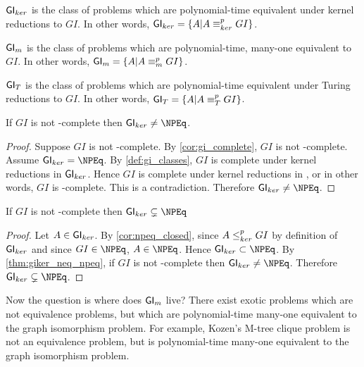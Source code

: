 \begin{definition}\label{def:gi_classes}${\mathsf{GI}}_{ker}$ is the class of problems
  which are polynomial-time equivalent under kernel reductions to $GI$. In
  other words, ${\mathsf{GI}}_{ker}=\{A|A\equiv^{p}_{ker} GI\}$.

  ${\mathsf{GI}}_m$ is the class of problems which are polynomial-time, many-one
  equivalent to $GI$. In other words, ${\mathsf{GI}}_m=\{A|A\equiv^{p}_m GI\}$.

  ${\mathsf{GI}}_T$ is the class of problems which are polynomial-time equivalent under
  Turing reductions to $GI$. In other words, ${\mathsf{GI}}_T=\{A|A\equiv^{p}_T GI\}$.
\end{definition}

\begin{theorem}\label{thm:giker_neq_npeq}If $GI$ is not \NP-complete then
  $\GIker\neq\NPEq$.\end{theorem}
\begin{proof}
  Suppose $GI$ is not \NP-complete. By \autoref{cor:gi_complete}, $GI$ is not
  \NPEq-complete. Assume $\GIker=\NPEq$. By \autoref{def:gi_classes}, $GI$ is
  complete under kernel reductions in ${\mathsf{GI}}_{ker}$. Hence $GI$ is complete under
  kernel reductions in \NPEq, or in other words, $GI$ is \NPEq-complete. This
  is a contradiction. Therefore $\GIker\neq\NPEq$.
\end{proof}

\begin{theorem}If $GI$ is not \NP-complete then
  $\GIker\subsetneq\NPEq$\end{theorem}
\begin{proof}Let $A\in{\ensuremath{\mathsf{GI}}}_{ker}$. By \autoref{cor:npeq_closed}, since $A\leq^{p}_{ker}
  GI$ by definition of ${\mathsf{GI}}_{ker}$ and since $GI\in\NPEq$, $A\in\NPEq$. Hence
  $\GIker\subset\NPEq$. By \autoref{thm:giker_neq_npeq}, if $GI$ is not
  \NP-complete then $\GIker\neq\NPEq$. Therefore
  $\GIker\subsetneq\NPEq$.\end{proof}

Now the question is where does ${\mathsf{GI}}_m$ live? There exist exotic problems which
are not equivalence problems, but which are polynomial-time many-one equivalent
to the graph isomorphism problem. For example, Kozen's M-tree clique problem is
not an equivalence problem, but is polynomial-time many-one equivalent to the
graph isomorphism problem.
